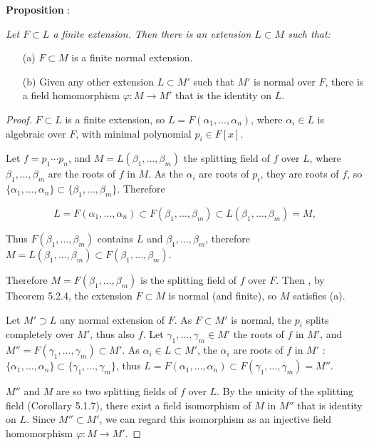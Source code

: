 \documentclass[11pt,a4paper]{article}
\begin{document}
{\bf Proposition} :  {\it Let $F \subset L$ a finite extension. Then there is an extension $L\subset M$ such that:
\begin{enumerate}
\item[(a)] $F \subset M$ is a finite normal extension.

\item[(b)]Given any other extension $L\subset M'$ such that $M'$ is normal over $F$, there is a field homomorphism $\varphi: M \to M'$ that is the identity on $L$.

\end{enumerate}
}
\begin{proof}
  $F \subset L$ is a finite extension, so $L = F(\alpha_1,\ldots,\alpha_n)$, where $\alpha_i \in L$ is algebraic over $F$, with minimal polynomial $p_i \in F[x]$.
  
Let $f = p_1\cdots p_n$, and $M = L(\beta_1,\ldots,\beta_m)$ the splitting field of $f$ over $L$, where $\beta_1,\ldots,\beta_m$ are the roots of $f$ in $M$. 
As the $\alpha_i$ are roots of $p_i$, they are roots of $f$, so  $\{\alpha_1,\ldots,\alpha_n\} \subset\{\beta_1,\ldots,\beta_m\}$. Therefore

$$L = F(\alpha_1,\ldots,\alpha_n) \subset F(\beta_1,\ldots,\beta_m) \subset L(\beta_1,\ldots,\beta_m) = M,$$

Thus $F(\beta_1,\ldots,\beta_m)$ contains  $L$ and $\beta_1,\ldots,\beta_m$, therefore $M = L(\beta_1,\ldots,\beta_m) \subset F(\beta_1,\ldots,\beta_m)$.

Therefore $M = F(\beta_1,\ldots,\beta_m)$ is the splitting field of $f$ over $F$. Then , by Theorem 5.2.4, the extension $F \subset M$ is normal (and finite), so $M$ satisfies (a).

Let $M' \supset L$ any normal extension of $F$. As $F \subset M'$ is normal, the $p_i$ splits completely over $M'$, thus also $f$. Let $\gamma_1,\ldots,\gamma_m \in M'$ the roots of $f$ in $M'$, and $M'' = F(\gamma_1,\ldots,\gamma_m) \subset M'$. As $\alpha_i  \in L \subset M'$, the $\alpha_i$ are roots of $f$ in $M'$ : $\{\alpha_1,\ldots,\alpha_n\}\subset\{\gamma_1,\ldots,\gamma_m\}$, thus $L = F(\alpha_1,\ldots,\alpha_n) \subset F(\gamma_1,\ldots,\gamma_m) = M''$.

$M''$ and $M$ are so two splitting fields of $f$ over $L$. By the unicity of the splitting field (Corollary 5.1.7), there exist a field isomorphism of $M$ in $M''$  that is identity on $L$. Since $M'' \subset M'$, we can regard this isomorphism as an injective field homomorphism $\varphi : M \to M'$.
\end{proof}
\end{document}
